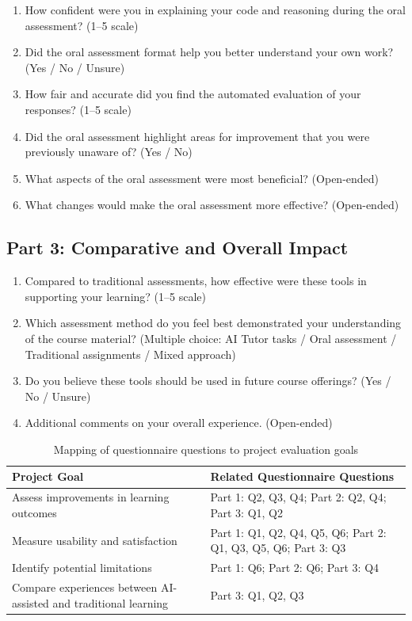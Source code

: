 \begin{enumerate}
    \item How confident were you in explaining your code and reasoning during the oral assessment? (1–5 scale)
    \item Did the oral assessment format help you better understand your own work? (Yes / No / Unsure)
    \item How fair and accurate did you find the automated evaluation of your responses? (1–5 scale)
    \item Did the oral assessment highlight areas for improvement that you were previously unaware of? (Yes / No)
    \item What aspects of the oral assessment were most beneficial? (Open-ended)
    \item What changes would make the oral assessment more effective? (Open-ended)
\end{enumerate}

\subsection{Part 3: Comparative and Overall Impact}
\begin{enumerate}
    \item Compared to traditional assessments, how effective were these tools in supporting your learning? (1–5 scale)
    \item Which assessment method do you feel best demonstrated your understanding of the course material? (Multiple choice: AI Tutor tasks / Oral assessment / Traditional assignments / Mixed approach)
    \item Do you believe these tools should be used in future course offerings? (Yes / No / Unsure)
    \item Additional comments on your overall experience. (Open-ended)
\end{enumerate}

\begin{table}[h]
\centering
\caption{Mapping of questionnaire questions to project evaluation goals}
\label{tab:eval_mapping}
\renewcommand{\arraystretch}{1.4} %
\begin{tabular}{p{5cm} p{9cm}}
\toprule
\textbf{Project Goal} & \textbf{Related Questionnaire Questions} \\
\midrule
Assess improvements in learning outcomes &
Part 1: Q2, Q3, Q4; Part 2: Q2, Q4; Part 3: Q1, Q2 \\[4pt]

Measure usability and satisfaction &
Part 1: Q1, Q2, Q4, Q5, Q6; Part 2: Q1, Q3, Q5, Q6; Part 3: Q3 \\[4pt]

Identify potential limitations &
Part 1: Q6; Part 2: Q6; Part 3: Q4 \\[4pt]

Compare experiences between AI-assisted and traditional learning &
Part 3: Q1, Q2, Q3 \\
\bottomrule
\end{tabular}
\end{table}

